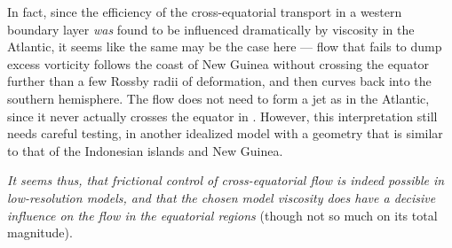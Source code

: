 \begin{items}
	\item In fact, since the efficiency of the cross-equatorial transport in a western boundary layer \emph{was} found to be influenced dramatically by viscosity in the Atlantic, it seems like the same may be the case here --- flow that fails to dump excess vorticity follows the coast of New Guinea without crossing the equator further than a few Rossby radii of deformation, and then curves back into the southern hemisphere. The flow does not need to form a jet as in the Atlantic, since it never actually crosses the equator in . However, this interpretation still needs careful testing, \eg in another idealized model with a geometry that is similar to that of the Indonesian islands and New Guinea.
\end{items}
%
%
\emph{It seems thus, that frictional control of cross-equatorial flow is indeed possible in low-resolution models, and that the chosen model viscosity does have a decisive influence on the flow in the equatorial regions} (though not so much on its total magnitude).
